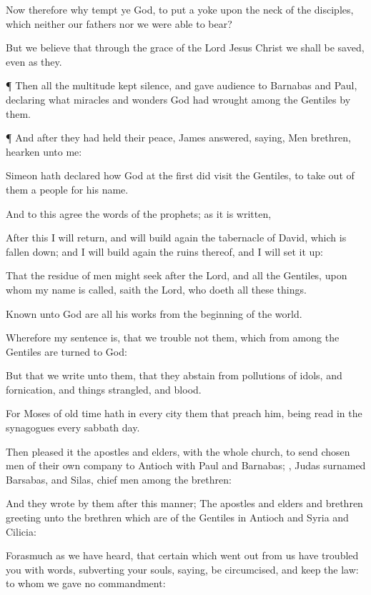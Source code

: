{Now
therefore
why tempt
ye
God, to
put a
yoke
upon the
neck of the
disciples,
which
neither
our
fathers
nor
we were
able to
bear?

But we
believe
that
through the
grace of the
Lord
Jesus
Christ we shall be
saved,
even
as
they.


\par }{\PP {}¶
Then
all the
multitude kept
silence,
and gave
audience to
Barnabas
and
Paul,
declaring
what
miracles
and
wonders
God had
wrought
among the
Gentiles
by
them.


\par }{\PP {}¶
And
after they had
held
their
peace,
James
answered,
saying,
Men
{}
brethren,
hearken unto
me:

Simeon hath
declared
how
God at the
first did
visit the
Gentiles, to
take out of
them a
people
for
his
name.

And to
this
agree the
words of the
prophets;
as it is
written,

After
this I will
return,
and will build
again the
tabernacle of
David,
which is fallen
down;
and I will build
again the
ruins
thereof,
and I will
set
it
up:

That the
residue of
men might
seek after the
Lord,
and
all the
Gentiles,
upon
whom
my
name is
called,
saith the
Lord, who
doeth
all these
things.

Known unto
God
are
all
his
works
from the beginning of the
world.

Wherefore
my sentence
is, that we
trouble
not them,
which from
among the
Gentiles are
turned
to
God:

But that we
write unto
them, that they
abstain
from
pollutions of
idols,
and
{}
fornication,
and
{} things
strangled,
and
{}
blood.

For
Moses
of
old
time
hath in
every
city
them that
preach
him, being
read
in the
synagogues
every sabbath
day.

Then pleased
it the
apostles
and
elders,
with the
whole
church, to
send
chosen
men
of their own
company
to
Antioch
with
Paul
and
Barnabas;
{},
Judas
surnamed
Barsabas,
and
Silas,
chief
men
among the
brethren:

And they
wrote
{}
by
them after this
manner; The
apostles
and
elders
and
brethren
{}
greeting unto the
brethren
which are
of the
Gentiles
in
Antioch
and
Syria
and
Cilicia:

Forasmuch
as we have
heard,
that
certain which went
out
from
us have
troubled
you with
words,
subverting
your
souls,
saying,
{} be
circumcised,
and
keep the
law: to
whom we
gave
no
{}
commandment:

}
